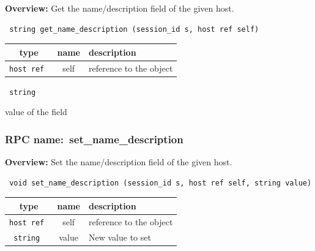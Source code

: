 {\bf Overview:} 
Get the name/description field of the given host.

\begin{verbatim} string get_name_description (session_id s, host ref self)\end{verbatim}



 
\vspace{0.3cm}
\begin{tabular}{|c|c|p{7cm}|}
 \hline
{\bf type} & {\bf name} & {\bf description} \\ \hline
{\tt host ref } & self & reference to the object \\ \hline 

\end{tabular}

\vspace{0.3cm}

{\tt 
string
}


value of the field
\vspace{0.3cm}
\vspace{0.3cm}
\vspace{0.3cm}
\subsubsection{RPC name:~set\_name\_description}

{\bf Overview:} 
Set the name/description field of the given host.

\begin{verbatim} void set_name_description (session_id s, host ref self, string value)\end{verbatim}



 
\vspace{0.3cm}
\begin{tabular}{|c|c|p{7cm}|}
 \hline
{\bf type} & {\bf name} & {\bf description} \\ \hline
{\tt host ref } & self & reference to the object \\ \hline 

{\tt string } & value & New value to set \\ \hline 

\end{tabular}

\vspace{0.3cm}

